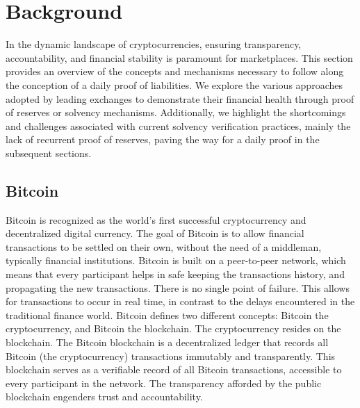 

\chapter{Background}


In the dynamic landscape of cryptocurrencies, ensuring transparency, accountability, and financial stability
is paramount for marketplaces. This section provides an overview of the concepts and mechanisms
necessary to follow along the conception of a daily proof of liabilities. We explore the various approaches adopted by leading exchanges
to demonstrate their financial health through proof of reserves or solvency mechanisms. Additionally, we
highlight the shortcomings and challenges associated with current solvency verification practices, mainly the lack of recurrent proof of reserves,
paving the way for a daily proof in the subsequent sections.


\section{Bitcoin}
Bitcoin is recognized as the world's first successful cryptocurrency and decentralized digital currency.
The goal of Bitcoin is to allow financial transactions to be settled on their own, without the need of a middleman, typically financial institutions.
Bitcoin is built on a peer-to-peer network, which means that every participant helps in safe keeping the transactions history, and propagating the new transactions.
There is no single point of failure. This allows for transactions to occur in real time, in contrast to the delays encountered in the traditional finance world.
Bitcoin defines two different concepts: Bitcoin the cryptocurrency, and Bitcoin the blockchain. The cryptocurrency resides on the blockchain.
The Bitcoin blockchain is a decentralized ledger that records all Bitcoin (the cryptocurrency) transactions immutably and transparently.
This blockchain serves as a verifiable record of all Bitcoin transactions, accessible to every participant in the network.
The transparency afforded by the public blockchain engenders trust and accountability. \cite{MB17}


